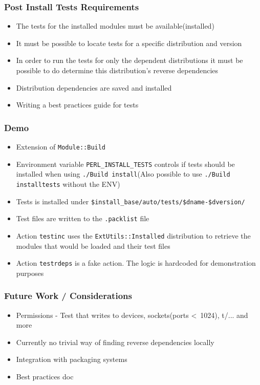 \documentclass[10pt]{beamer}
\begin{document}
\begin{frame}
\frametitle{Post Install Tests Requirements}
\begin{itemize}
\item The tests for the installed modules must be available(installed)
\item It must be possible to locate tests for a specific distribution and version
\item In order to run the tests for only the dependent distributions it must be possible to do determine this distribution's reverse dependencies
\item Distribution dependencies are saved and installed
\item Writing a best practices guide for tests
\end{itemize}
\end{frame}

\begin{frame}[fragile]
\frametitle{Demo}

\begin{itemize}
\item Extension of \verb|Module::Build|
\item Environment variable \verb|PERL_INSTALL_TESTS| controls if tests should be installed when using  \verb|./Build install|(Also possible to use \verb|./Build installtests| without the ENV)
\item Tests is installed under \verb|$install_base/auto/tests/$dname-$dversion/|
\item Test files are written to the \verb|.packlist| file
\item Action \verb|testinc| uses the \verb|ExtUtils::Installed| distribution to retrieve the modules that would be loaded and their test files
\item Action \verb|testrdeps| is a fake action. The logic is hardcoded for demonstration purposes
\end{itemize}
\end{frame}

\begin{frame}[fragile]
\frametitle{Future Work / Considerations}
\begin{itemize}
\item Permissions - Test that writes to devices, sockets(ports \textless \ 1024), t/... and more
\item Currently no trivial way of finding reverse dependencies locally
\item Integration with packaging systems
\item Best practices doc
\end{itemize}
\end{frame}
\end{document}
